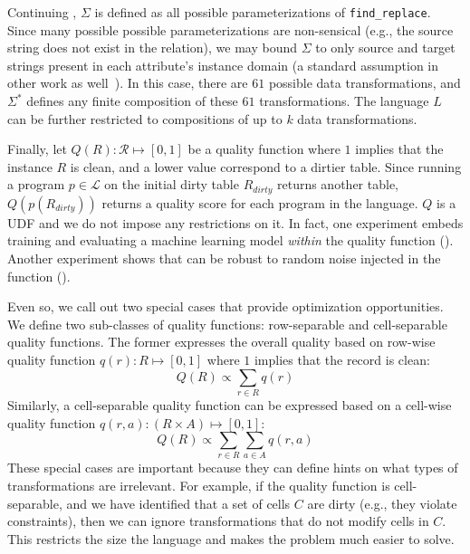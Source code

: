 \begin{example}\label{ex2}
  Continuing , $\Sigma$ is defined as all possible parameterizations of \texttt{find\_replace}.  Since many possible possible parameterizations are non-sensical (e.g., the source string does not exist in the relation), we may bound $\Sigma$ to only source and target strings present in each attribute's instance domain (a standard assumption in other work as well~\cite{DBLP:series/synthesis/2012Fan}).  In this case, there are $61$ possible data transformations, and $\Sigma^*$ defines any finite composition of these $61$ transformations.  The language $L$ can be further restricted to compositions of up to $k$ data transformations.  
\end{example}

Finally, let $Q(R): \mathcal{R} \mapsto [0,1]$ be a quality function where $1$ implies that the instance $R$ is clean, and a lower value correspond to a dirtier table.
Since running a program $p\in\mathcal{L}$ on the initial dirty table $R_{dirty}$ returns another table, $Q(p(R_{dirty}))$ returns a quality score for each program in the language.  
$Q$ is a UDF and we do not impose any restrictions on it. In fact, one experiment embeds training and evaluating a machine learning model {\it within} the quality function ().  Another experiment shows that \sys can be robust to random noise injected in the function ().   

Even so, we call out two special cases that provide optimization opportunities. 
We define two sub-classes of quality functions: row-separable and cell-separable quality functions.
The former expresses the overall quality based on row-wise quality function $q(r): R \mapsto [0,1]$ where $1$ implies that the record is clean:
{\small\[Q(R) \propto \sum_{r \in R} q(r)\]}
\noindent Similarly, a cell-separable quality function can be expressed based on a cell-wise quality function $q(r, a): (R\times A) \mapsto [0,1]$:
{\small\[Q(R) \propto \sum_{r \in R} \sum_{a \in A} q(r,a)\]}
These special cases are important because they can define hints on what types of transformations are irrelevant.
For example, if the quality function is cell-separable, and we have identified that a set of cells $C$ are dirty (e.g., they violate constraints), then we can ignore transformations that do not modify cells in $C$.  This restricts the size the language and makes the problem much easier to solve.


